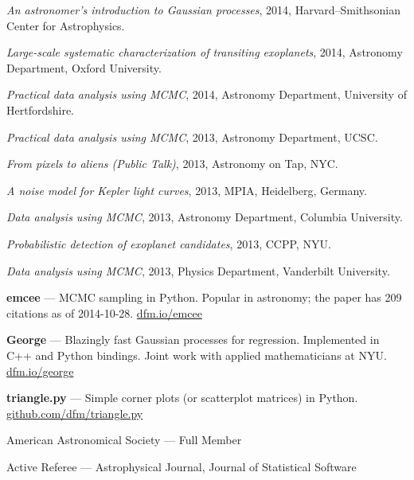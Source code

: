 \documentclass[12pt,letterpaper]{article}
\begin{document}
\begin{list}{}{\cvlist}
\item \emph{An astronomer's introduction to Gaussian processes},
    2014, Harvard--Smithsonian Center for Astrophysics.

\item \emph{Large-scale systematic characterization of transiting exoplanets},
    2014, Astronomy Department, Oxford University.

\item \emph{Practical data analysis using MCMC},
    2014, Astronomy Department, University of Hertfordshire.

\item \emph{Practical data analysis using MCMC},
    2013, Astronomy Department, UCSC.

\item \emph{From pixels to aliens (Public Talk)},
    2013, Astronomy on Tap, NYC.

\item \emph{A noise model for Kepler light curves},
    2013, MPIA, Heidelberg, Germany.

\item \emph{Data analysis using MCMC},
    2013, Astronomy Department, Columbia University.

\item \emph{Probabilistic detection of exoplanet candidates},
    2013, CCPP, NYU.

\item \emph{Data analysis using MCMC},
    2013, Physics Department, Vanderbilt University.
\end{list}

\begin{list}{}{\cvlist}

\item {\bf emcee} ---
    MCMC sampling in Python. Popular in astronomy; the paper has 209 citations
    as of 2014-10-28. \url{dfm.io/emcee}

\item {\bf George} ---
    Blazingly fast Gaussian processes for regression. Implemented in C++ and
    Python bindings. Joint work with applied mathematicians at NYU.
    \url{dfm.io/george}

\item {\bf triangle.py} ---
    Simple corner plots (or scatterplot matrices) in Python.
    \url{github.com/dfm/triangle.py}


\end{list}


\begin{list}{}{\cvlist}
\item American Astronomical Society --- Full Member
\item Active Referee --- Astrophysical Journal, Journal of Statistical Software
\end{list}
\end{document}
